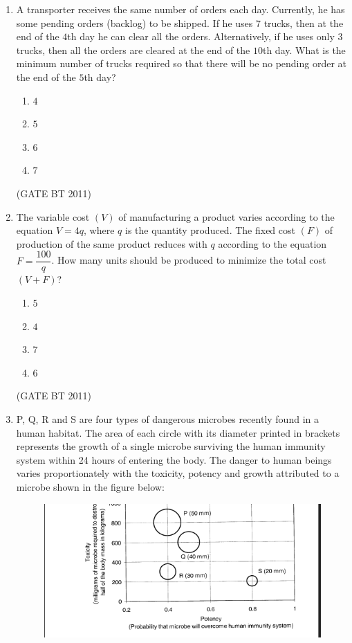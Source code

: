 \documentclass[journal,12pt,onecolumn]{IEEEtran}
\begin{document}
\begin{enumerate}
\item A transporter receives the same number of orders each day. 
Currently, he has some pending orders (backlog) to be shipped. 
If he uses $7$ trucks, then at the end of the $4$th day he can clear all the orders. 
Alternatively, if he uses only $3$ trucks, then all the orders are cleared at the end of the $10$th day. 
What is the minimum number of trucks required so that there will be no pending order at the end of the $5$th day?

\begin{multicols}{4}
  \begin{enumerate}
    \item $4$
    \item $5$
    \item $6$
    \item $7$
  \end{enumerate}
\end{multicols} \hfill(GATE BT 2011)

\item The variable cost $(V)$ of manufacturing a product varies according to the equation 
$V = 4q$, where $q$ is the quantity produced. 
The fixed cost $(F)$ of production of the same product reduces with $q$ according to the equation 
$F = \dfrac{100}{q}$. 
How many units should be produced to minimize the total cost $(V + F)$?

\begin{multicols}{4}
  \begin{enumerate}
    \item $5$
    \item $4$
    \item $7$
    \item $6$
  \end{enumerate}
\end{multicols} \hfill(GATE BT 2011)

\item P, Q, R and S are four types of dangerous microbes recently found in a human habitat. 
The area of each circle with its diameter printed in brackets represents the growth of a single microbe surviving the human immunity system within 24 hours of entering the body. 
The danger to human beings varies proportionately with the toxicity, potency and growth attributed to a microbe shown in the figure below:

\begin{figure}[H]
   \centering
   \includegraphics[width=0.65\columnwidth]{fig 1.png}
   \caption{}
   \label{fig:question65}
\end{figure}


\end{enumerate}
\end{document}
